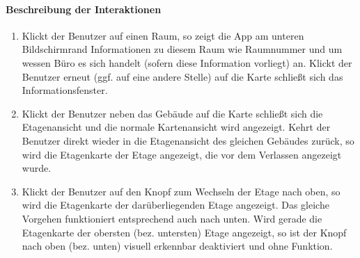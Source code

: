 \paragraph{Beschreibung der Interaktionen}
\begin{enumerate}
    \item Klickt der Benutzer auf einen Raum, so zeigt die App am unteren Bildschirmrand Informationen zu diesem Raum wie Raumnummer und um wessen Büro es sich handelt (sofern diese Information vorliegt) an. Klickt der Benutzer erneut (ggf. auf eine andere Stelle) auf die Karte schließt sich das Informationsfenster.
    \item Klickt der Benutzer neben das Gebäude auf die Karte schließt sich die Etagenansicht und die normale Kartenansicht wird angezeigt. Kehrt der Benutzer direkt wieder in die Etagenansicht des gleichen Gebäudes zurück, so wird die Etagenkarte der Etage angezeigt, die vor dem Verlassen angezeigt wurde.
    \item Klickt der Benutzer auf den Knopf zum Wechseln der Etage nach oben, so wird die Etagenkarte der darüberliegenden Etage angezeigt. Das gleiche Vorgehen funktioniert entsprechend auch nach unten. Wird gerade die Etagenkarte der obersten (bez. untersten) Etage angezeigt, so ist der Knopf nach oben (bez. unten) visuell erkennbar deaktiviert und ohne Funktion.
\end{enumerate}